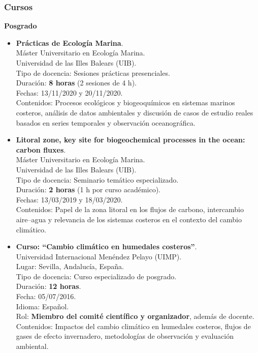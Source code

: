 \documentclass[11pt,a4paper]{article}
\begin{document}
\subsubsection{Cursos}

\textbf{Posgrado}

\begin{itemize}[leftmargin=*]

    \item \textbf{Prácticas de Ecología Marina}.\\
    Máster Universitario en Ecología Marina.\\
    Universidad de las Illes Balears (UIB).\\
    Tipo de docencia: Sesiones prácticas presenciales.\\
    Duración: \textbf{8 horas} (2 sesiones de 4 h).\\
    Fechas: 13/11/2020 y 20/11/2020.\\
    Contenidos: Procesos ecológicos y biogeoquímicos en sistemas marinos costeros, análisis de datos ambientales y discusión de casos de estudio reales basados en series temporales y observación oceanográfica.

    \item \textbf{Litoral zone, key site for biogeochemical processes in the ocean: carbon fluxes}.\\
    Máster Universitario en Ecología Marina.\\
    Universidad de las Illes Balears (UIB).\\
    Tipo de docencia: Seminario temático especializado.\\
    Duración: \textbf{2 horas} (1 h por curso académico).\\
    Fechas: 13/03/2019 y 18/03/2020.\\
    Contenidos: Papel de la zona litoral en los flujos de carbono, intercambio aire--agua y relevancia de los sistemas costeros en el contexto del cambio climático.

    \item \textbf{Curso: ``Cambio climático en humedales costeros''}.\\
    Universidad Internacional Menéndez Pelayo (UIMP).\\
    Lugar: Sevilla, Andalucía, España.\\
    Tipo de docencia: Curso especializado de posgrado.\\
    Duración: \textbf{12 horas}.\\
    Fecha: 05/07/2016.\\
    Idioma: Español.\\
    Rol: \textbf{Miembro del comité científico y organizador}, además de docente.\\
    Contenidos: Impactos del cambio climático en humedales costeros, flujos de gases de efecto invernadero, metodologías de observación y evaluación ambiental.

\end{itemize}
\end{document}

